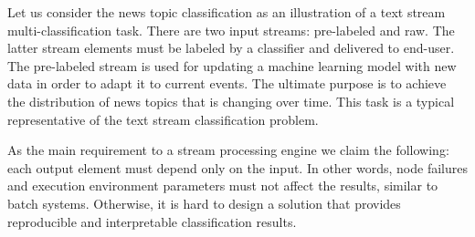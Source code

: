\label {fs-short-problem}

Let us consider the news topic classification as an illustration of a text stream multi-classification task. There are two input streams: pre-labeled and raw. The latter stream elements must be labeled by a classifier and delivered to end-user. The pre-labeled stream is used for updating a machine learning model with new data in order to adapt it to current events. The ultimate purpose is to achieve the distribution of news topics that is changing over time. This task is a typical representative of the text stream classification problem.

As the main requirement to a stream processing engine we claim the following: each output element must depend only on the input. In other words, node failures and execution environment parameters must not affect the results, similar to batch systems. Otherwise, it is hard to design a solution that provides reproducible and interpretable classification results.